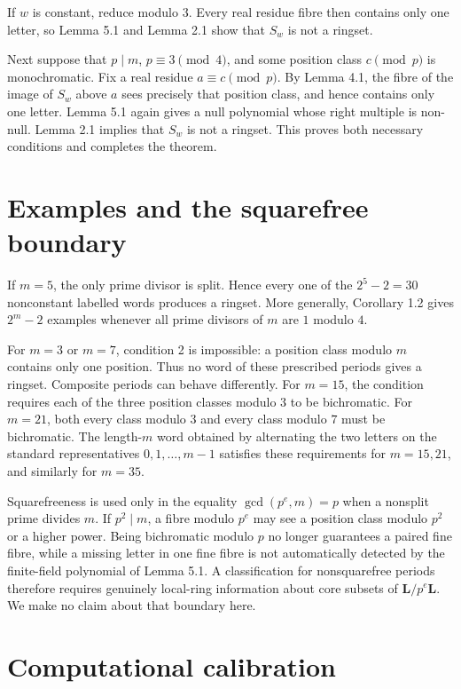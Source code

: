 \documentclass[11pt]{article}
\theoremstyle{remark}
\numberwithin{equation}{section}
\begin{document}
If $w$ is constant, reduce modulo $3$. Every real residue fibre then contains
only one letter, so Lemma 5.1 and Lemma 2.1 show that $S_w$ is not a ringset.

Next suppose that $p\mid m$, $p\equiv3\pmod4$, and some position class
$c\pmod p$ is monochromatic. Fix a real residue $a\equiv c\pmod p$. By
Lemma 4.1, the fibre of the image of $S_w$ above $a$ sees precisely that
position class, and hence contains only one letter. Lemma 5.1 again gives a
null polynomial whose right multiple is non-null. Lemma 2.1 implies that
$S_w$ is not a ringset. This proves both necessary conditions and completes
the theorem.

\section{Examples and the squarefree boundary}

If $m=5$, the only prime divisor is split. Hence every one of the
$2^5-2=30$ nonconstant labelled words produces a ringset. More generally,
Corollary 1.2 gives $2^m-2$ examples whenever all prime divisors of $m$ are
$1$ modulo $4$.

For $m=3$ or $m=7$, condition 2 is impossible: a position class modulo $m$
contains only one position. Thus no word of these prescribed periods gives a
ringset. Composite periods can behave differently. For $m=15$, the condition
requires each of the three position classes modulo $3$ to be bichromatic. For
$m=21$, both every class modulo $3$ and every class modulo $7$ must be
bichromatic. The length-$m$ word obtained by alternating the two letters on
the standard representatives $0,1,\ldots,m-1$ satisfies these requirements
for $m=15,21$, and similarly for $m=35$.

Squarefreeness is used only in the equality
$\gcd(p^e,m)=p$ when a nonsplit prime divides $m$. If $p^2\mid m$, a fibre
modulo $p^e$ may see a position class modulo $p^2$ or a higher power. Being
bichromatic modulo $p$ no longer guarantees a paired fine fibre, while a
missing letter in one fine fibre is not automatically detected by the
finite-field polynomial of Lemma 5.1. A classification for nonsquarefree
periods therefore requires genuinely local-ring information about core
subsets of $\mathbf L/p^e\mathbf L$. We make no claim about that boundary
here.

\section{Computational calibration}
\end{document}
